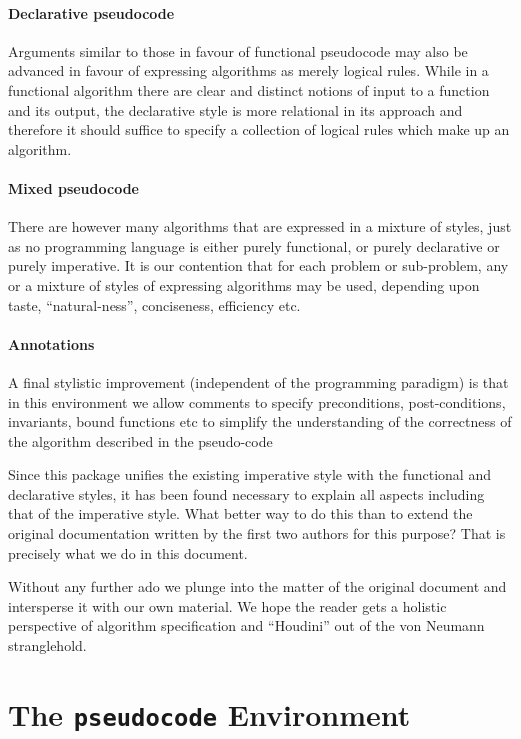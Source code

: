 \documentclass[a4]{article}
\newcommand{\keyword}[1]{\texttt{#1}}
\begin{document}
\paragraph{Declarative pseudocode} Arguments similar to those in favour of
functional pseudocode may also be advanced in favour of expressing
algorithms as merely logical rules. While in a functional algorithm
there are clear and distinct notions of input to a function and its 
output, the declarative style is more relational in its approach and
therefore it should suffice to specify a collection of logical rules 
which make up an algorithm. 

\paragraph{Mixed pseudocode} There are however many algorithms that
are expressed in a mixture of styles, just as no programming language
is either purely functional, or purely declarative or purely
imperative. It is our contention that for each problem or sub-problem,
any or a mixture of styles of expressing algorithms may be used,
depending upon taste, ``natural-ness'', conciseness, efficiency etc.

\paragraph{Annotations} A final stylistic improvement (independent of the
programming paradigm) is that in this environment we allow comments to specify
preconditions, post-conditions, invariants, bound functions etc to simplify the
understanding of the correctness of the algorithm described in the pseudo-code

Since this package unifies the existing imperative style with the functional and
declarative styles, it has been found necessary to explain all aspects including
that of the imperative style. What better way to do this than to extend the
original documentation written by the first two authors for this purpose? That
is precisely what we do in this document.


Without any further ado we plunge into the matter of the original document and
intersperse it with our own material. We hope the reader gets a holistic
perspective of algorithm specification and ``Houdini'' out of the von Neumann
stranglehold.

\section{The \keyword{pseudocode} Environment}
\end{document}
